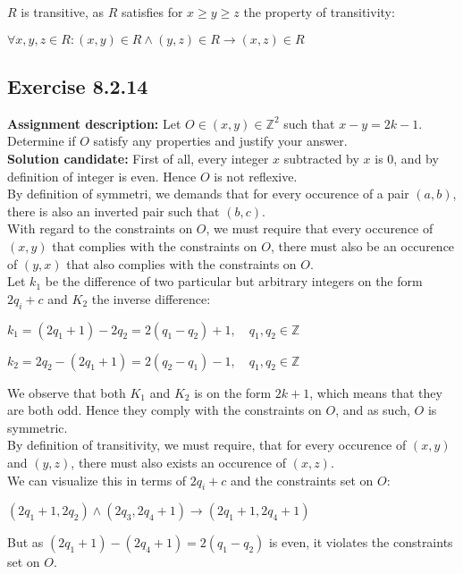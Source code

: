 \documentclass{report}
\newcommand{\cent}[1]{\begin{center}#1\end{center}}
\newcommand{\doubleZ}{\mathbb{Z}}
\newcommand{\In}{\! \in \!}
\newcommand{\assignmentDescription}{\textbf{Assignment description: }}
\newcommand{\solution}{\textbf{Solution candidate: }}
\newcommand{\Exercise}[1]{\subsection{Exercise #1}}
\begin{document}
	 $R$ is transitive, as $R$ satisfies for $x \geq y \geq z$ the property of transitivity:
	 
	 \cent{$\forall x,y,z \In R : (x,y) \In R  \wedge (y,z) \In R \to (x,z) \In R$}
	 
	 \Exercise{8.2.14}
	 
	 \assignmentDescription
	 Let $O\In (x,y) \In \doubleZ^2$ such that $x-y = 2k-1$. Determine if $O$ satisfy any properties and justify your answer.\\
	 
	 \solution
	 First of all, every integer $x$ subtracted by $x$ is 0, and by definition of integer is even. Hence $O$ is not reflexive.\\
	 
	 By definition of symmetri, we demands that for every occurence of a pair $(a,b)$, there is also an inverted pair such that $(b,c)$.\\ 
	 
	 With regard to the constraints on $O$, we must require that every occurence of $(x,y)$ that complies with the constraints on $O$, there must also be an occurence of $(y,x)$ that also complies with the constraints on $O$.\\
	 
	 Let $k_1$ be the difference of two particular but arbitrary integers on the form $2q_i + c$ and $K_2$ the inverse difference:
	 
	 \cent{$k_1 = (2q_1+1) - 2q_2 = 2(q_1 - q_2) + 1, \quad q_1,q_2 \In \doubleZ$}
	 
	 \cent{$k_2 = 2q_2  - (2q_1 + 1) = 2(q_2 -q_1) - 1, \quad q_1,q_2 \In \doubleZ$}
	 
	 We observe that both $K_1$ and $K_2$ is on the form $2k +1$, which means that they are both odd. Hence they comply with the constraints on $O$, and as such, $O$ is symmetric.\\
	 
	 By definition of transitivity, we must require, that for every occurence of $(x,y)$ and $(y,z)$, there must also exists an occurence of $(x,z)$.\\
	 
	 We can visualize this in terms of $2q_i + c$ and the constraints set on $O$:
	 
	 \cent{$(2q_1+1,2q_2) \wedge (2q_3,2q_4 + 1) \to (2q_1 + 1, 2q_4+1)$}
	 
	 But as $(2q_1 + 1) - (2q_4 + 1) = 2(q_1 - q_2)$ is even, it violates the constraints set on $O$.\\ 
	 
\end{document}
